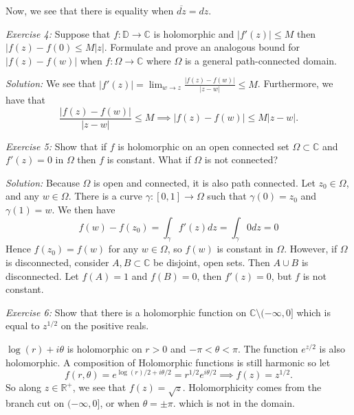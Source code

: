 \documentclass{article}
\newcommand{\exercise}[2]{
\vspace{0.2in}\begin{mdframed}[
  backgroundcolor=problem,
  skipabove=\topsep,
  skipbelow=\topsep
  ]
  \emph{Exercise {#1}:} {#2}
\end{mdframed}}
\newcommand{\R}{\mathbb{R}}
\newcommand{\C}{\mathbb{C}}
\begin{document}
    Now, we see that there is equality when $\overline{dz} = dz$.
    \exercise{4}{Suppose that $f: \mathbb{D}\to\C$ is holomorphic and $|f'(z)| \le M$ then $|f(z)-f(0)\le M|z|$. Formulate and prove an analogous bound for $|f(z)-f(w)|$ when $f:\Omega\to\C$ where $\Omega$ is a general path-connected domain.}
    \textit{Solution:}
    We see that $|f'(z)| = \lim_{w\to z}\frac{|f(z)-f(w)|}{|z-w|}\le M$. Furthermore, we have that 
    \[ \frac{|f(z)-f(w)|}{|z-w|} \le M \implies |f(z)-f(w)|\le M|z-w|.\]
    \exercise{5}{Show that if $f$ is holomorphic on an open connected set $\Omega \subset \C$ and $f'(z) = 0$ in $\Omega$ then $f$ is constant. What if $\Omega$ is not connected?}
    \textit{Solution:}
    Because $\Omega$ is open and connected, it is also path connected. Let $z_0\in \Omega$, and any $w\in \Omega$. There is a curve $\gamma: [0,1]\to \Omega$ such that $\gamma(0)=z_0$ and $\gamma(1)=w$. We then have
    \[f(w)-f(z_0) = \int_{\gamma}f'(z)dz = \int_\gamma 0dz = 0\]
    Hence $f(z_0) = f(w)$ for any $w\in \Omega$, so $f(w)$ is constant in $\Omega$. However, if $\Omega$ is disconnected, consider $A,B\subset \C$ be disjoint, open sets. Then $A\cup B$ is disconnected. Let $f(A) = 1$ and $f(B) = 0$, then $f'(z) = 0$, but $f$ is not constant. 
    \exercise{6}{Show that there is a holomorphic function on $\C\setminus(-\infty,0]$ which is equal to $z^{1/2}$ on the positive reals.}
    $\log{(r)} + i\theta$ is holomorphic on $r > 0$ and $-\pi < \theta < \pi$. The function $e^{z/2}$ is also holomorphic. A composition of Holomorphic functions is still harmonic so let
    \[f(r,\theta) = e^{\log{(r)}/2 + i\theta/2} = r^{1/2}e^{i\theta/2} \implies f(z) = z^{1/2}.\]
    So along $z \in \R^+$, we see that $f(z) = \sqrt{z}$. Holomorphicity comes from the branch cut on $(-\infty,0]$, or when $\theta = \pm \pi$. which is not in the domain.
\end{document}
